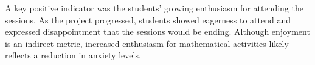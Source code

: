\documentclass[11pt, a4paper, notitlepage]{article}
\begin{document}
\par
A key positive indicator was the students' growing enthusiasm for attending the sessions. As the project progressed, students showed eagerness to attend and expressed disappointment that the sessions would be ending. Although enjoyment is an indirect metric, increased enthusiasm for mathematical activities likely reflects a reduction in anxiety levels.

\end{document}
